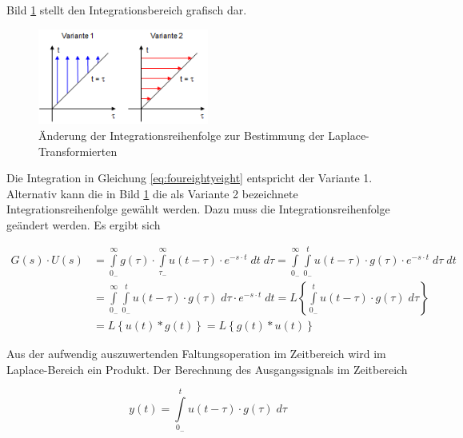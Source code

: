 \noindent Bild \ref{fig:HerleitungFaltung} stellt den Integrationsbereich grafisch dar.

\begin{figure}[H]
  \centerline{\includegraphics[width=0.5\textwidth]{Kapitel3/Bilder/image9}}
  \caption{Änderung der Integrationsreihenfolge zur Bestimmung der Laplace-Transformierten}
  \label{fig:HerleitungFaltung}
\end{figure}

\noindent Die Integration in Gleichung \eqref{eq:foureightyeight} entspricht der Variante 1. Alternativ kann die in Bild \ref{fig:HerleitungFaltung} die als Variante 2 bezeichnete Integrationsreihenfolge gew\"{a}hlt werden. Dazu muss die Integrationsreihenfolge ge\"{a}ndert werden. Es ergibt sich

\begin{equation}\label{eq:foureightyeight}
\begin{split}
G\left(s\right)\cdot U\left(s\right) & = \int\limits _{0_{-} }^{\infty }g\left(\tau \right)\cdot \int\limits  _{\tau _{-} }^{\infty }u\left(t-\tau \right)\cdot e^{-s\cdot t} \;dt\;d\tau   =\int\limits  _{0_{-} }^{\infty }\int\limits  _{0_{-} }^{t}u\left(t-\tau \right)\cdot g\left(\tau \right)\cdot e^{-s\cdot t} \;d\tau \;dt  \\
& = \int\limits  _{0_{-} }^{\infty }\int\limits  _{0_{-} }^{t}u\left(t-\tau \right)\cdot g\left(\tau \right) \;d\tau \cdot e^{-s\cdot t} \;dt = L\left\{\int\limits _{0_{-} }^{t}u\left(t - \tau \right)\cdot g(\tau) \;d\tau  \right\} \\
& = L\left\{u(t) * g(t)\right\} = L\left\{g(t)*u(t)\right\}
\end{split}
\end{equation}

\noindent Aus der aufwendig auszuwertenden Faltungsoperation im Zeitbereich wird im Laplace-Bereich ein Produkt. Der Berechnung des Ausgangssignals im Zeitbereich 

\begin{equation}\label{eq:foureightynine}
y\left(t\right)=\int\limits _{0_{-} }^{t}u\left(t-\tau \right)\cdot g\left(\tau \right)\;d\tau 
\end{equation}

